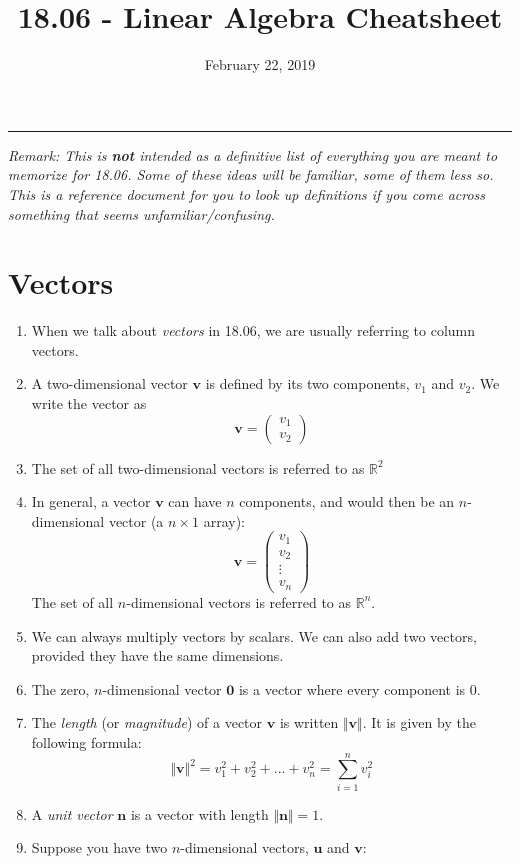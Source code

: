 \documentclass[11pt]{article}
\title{18.06 - Linear Algebra Cheatsheet}
\author{}
\date{February 22, 2019}
\renewcommand*{\vec}[1]{\mathbf{#1}}
\begin{document}
\maketitle


\rule{\textwidth}{1pt}
\vskip 10pt
\noindent \emph{Remark: This is \textbf{not} intended as a definitive list of everything you are meant to memorize for 18.06. Some of these ideas will be familiar, some of them less so. This is a reference document for you to look up definitions if you come across something that seems unfamiliar/confusing.}
\section{Vectors}
\begin{enumerate}
\item When we talk about \emph{vectors} in 18.06, we are usually referring to column vectors. 
\item A two-dimensional vector $\vec{v}$ is defined by its two components, $v_1$ and $v_2$. We write the vector as
$$\boxed{\vec{v} = \begin{pmatrix} v_1 \\ v_2 \end{pmatrix}}$$
\item The set of all two-dimensional vectors is referred to as $\mathbb{R}^2$
\item In general, a vector $\vec{v}$ can have $n$ components, and would then be an $n$-dimensional vector (a $n\times 1$ array):
$$\boxed{\vec{v} = \begin{pmatrix} v_1 \\ v_2 \\ \vdots \\ v_n \end{pmatrix}}$$
The set of all $n$-dimensional vectors is referred to as $\mathbb{R}^n$.
\item We can always multiply vectors by scalars. We can also add two vectors, provided they have the same dimensions.
\item The zero, $n$-dimensional vector $\vec{0}$ is a vector where every component is $0$. 
\item The \emph{length} (or \emph{magnitude}) of a vector $\vec{v}$ is written $\Vert \vec{v} \Vert$. It is given by the following formula:
$$\boxed{\Vert \vec{v} \Vert^2 = v_1^2 + v_2^2 +...+ v_n^2 =  \sum_{i=1}^n v_i^2}$$
\item A \emph{unit vector} $\vec{n}$ is a vector with length $\Vert\vec{n}\Vert =1$. 
\item Suppose you have two $n$-dimensional vectors, $\vec{u}$ and $\vec{v}$:

\end{enumerate}
\end{document}

